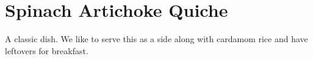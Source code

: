\section[Spinach Quiche]{Spinach Artichoke Quiche}

\begin{recipestats}[
        servings=4 people,
        preptime=45 \minute,
        bakingtime=45 \minute,
        source=Mike \& Jane,
        original=\citefield{joyofcooking2006}{title}~\cite{joyofcooking2006},
    ]
\end{recipestats}

\begin{recipeabstract}
    A classic dish.
    We like to serve this as a side along with cardamom rice and have leftovers for breakfast.
\end{recipeabstract}

\begin{ingredientcolumns}
    \begin{ingredientblock}
        \\
        \\
        \\
        \\
        \\
    \end{ingredientblock}
    \begin{ingredientblock}
        \\
        \\
        \\
        \\
        \\
    \end{ingredientblock}
\end{ingredientcolumns}

